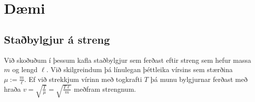 \ifdefined \wholebook \else\documentclass[oneside]{book}\usepackage{EdlBook}\graphicspath{{figures/}}
\begin{document}

\newpage

\section{Dæmi}

\subsection*{Staðbylgjur á streng}

\begin{tcolorbox}
Við skoðuðum í þessum kafla staðbylgjur sem ferðast eftir streng sem hefur massa $m$ og lengd $\ell$. Við skilgreindum þá línulegan þéttleika vírsins sem stærðina $\mu := \frac{m}{\ell}$. Ef við strekkjum vírinn með togkrafti $T$ þá munu bylgjurnar ferðast með hraða $v = \sqrt{\frac{T}{\mu}} = \sqrt{\frac{T \ell }{m}}$ meðfram strengnum.
\end{tcolorbox}
\end{document}

